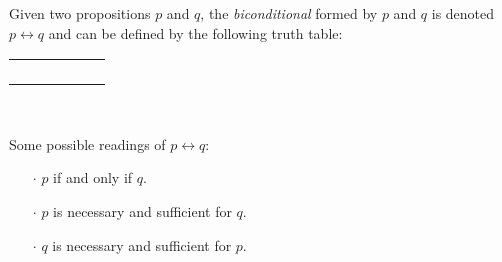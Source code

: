 \begin{definition}[Biconditional]
    \begin{center}
        \begin{minipage}[t]{.55\linewidth}
            Given two propositions \(p\) and \(q\), the \emph{biconditional} formed by \(p\) and \(q\)
            is denoted \(p \leftrightarrow q\) and can be defined by the following truth table:
            \begin{table}[H]
                \centering
                \label{tab:iff}
                \begin{tabular}{|CcCc||Cc|}
                    \hline
                     &  &  \\ \hline
                    \thead{\(\top\)} & \thead{\(\top\)} &  \\
                    \thead{\(\top\)} & \thead{\(\bot\)} &  \\
                    \thead{\(\bot\)} & \thead{\(\top\)} &  \\
                    \thead{\(\bot\)} & \thead{\(\bot\)} &  \\ \hline
                \end{tabular}
            \end{table}
        \end{minipage}%
        \begin{minipage}[t]{.05\linewidth}
            ~
        \end{minipage}%
        \begin{minipage}[t]{.4\linewidth}
            Some possible readings of \(p \leftrightarrow q\):\\
            \begin{itemize}
                \item[\(\cdot\)]
                    \(p\) if and only if \(q\).
                \item[\(\cdot\)]
                    \(p\) is necessary and sufficient for \(q\).
                \item[\(\cdot\)]
                    \(q\) is necessary and sufficient for \(p\).
            \end{itemize}
        \end{minipage}
    \end{center}
\end{definition}

